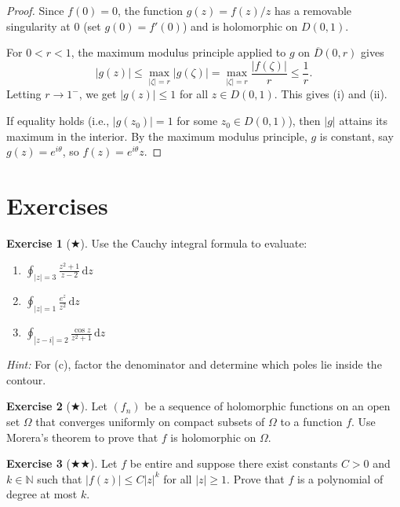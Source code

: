 \documentclass[12pt,a4paper,openany]{book}
\theoremstyle{definition}
\newtheorem{exercise}{Exercise}[chapter]
\theoremstyle{plain}
\theoremstyle{remark}
\newcommand{\N}{\mathbb{N}}
\newcommand{\dd}{\mathrm{d}}
\newcommand{\abs}[1]{\left|#1\right|}
\begin{document}
\begin{proof}
Since $f(0)=0$, the function $g(z)=f(z)/z$ has a removable singularity at $0$
(set $g(0)=f'(0)$) and is holomorphic on $D(0,1)$.

For $0<r<1$, the maximum modulus principle applied to $g$ on $\overline{D}(0,r)$ gives
\[
  \abs{g(z)} \le \max_{\abs{\zeta}=r}\abs{g(\zeta)}
  = \max_{\abs{\zeta}=r}\frac{\abs{f(\zeta)}}{r}
  \le \frac{1}{r}.
\]
Letting $r\to 1^-$, we get $\abs{g(z)}\le 1$ for all $z\in D(0,1)$. This gives
(i) and (ii).

If equality holds (i.e., $\abs{g(z_0)}=1$ for some $z_0\in D(0,1)$), then
$\abs{g}$ attains its maximum in the interior. By the maximum modulus principle,
$g$ is constant, say $g(z)=e^{i\theta}$, so $f(z)=e^{i\theta}z$.
\end{proof}

\section{Exercises}
\label{sec:exercises-ch5}

\begin{exercise}[$\bigstar$]\label{exo:cauchy-formula-1}
Use the Cauchy integral formula to evaluate:
\begin{enumerate}[label=(\alph*)]
  \item $\displaystyle\oint_{\abs{z}=3}\frac{z^2+1}{z-2}\,\dd z$
  \item $\displaystyle\oint_{\abs{z}=1}\frac{e^z}{z^2}\,\dd z$
  \item $\displaystyle\oint_{\abs{z-i}=2}\frac{\cos z}{z^2+1}\,\dd z$
\end{enumerate}
\textit{Hint:} For (c), factor the denominator and determine which poles lie inside the contour.
\end{exercise}

\begin{exercise}[$\bigstar$]\label{exo:morera-application}
Let $(f_n)$ be a sequence of holomorphic functions on an open set $\Omega$ that
converges uniformly on compact subsets of $\Omega$ to a function $f$. Use
Morera's theorem to prove that $f$ is holomorphic on $\Omega$.
\end{exercise}

\begin{exercise}[$\bigstar\!\bigstar$]\label{exo:cauchy-inequality-application}
Let $f$ be entire and suppose there exist constants $C>0$ and $k\in\N$ such that
$\abs{f(z)}\le C\abs{z}^k$ for all $\abs{z}\ge 1$. Prove that $f$ is a
polynomial of degree at most $k$.
\end{exercise}
\end{document}
